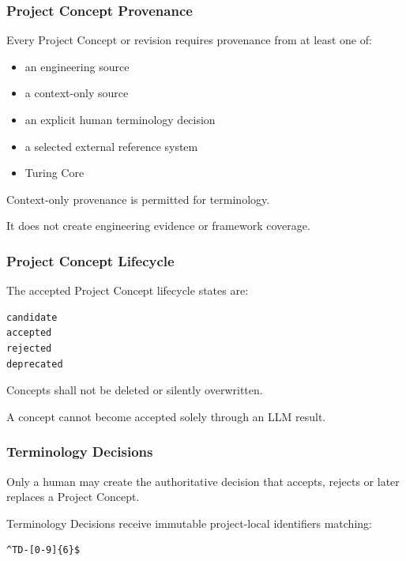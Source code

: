\hypertarget{project-concept-provenance}{%
\subsubsection{Project Concept Provenance}\label{project-concept-provenance}}

Every Project Concept or revision requires provenance from at least one of:

\begin{itemize}
\tightlist
\item
  an engineering source
\item
  a context-only source
\item
  an explicit human terminology decision
\item
  a selected external reference system
\item
  Turing Core
\end{itemize}

Context-only provenance is permitted for terminology.

It does not create engineering evidence or framework coverage.

\hypertarget{project-concept-lifecycle}{%
\subsubsection{Project Concept Lifecycle}\label{project-concept-lifecycle}}

The accepted Project Concept lifecycle states are:

\begin{verbatim}
candidate
accepted
rejected
deprecated
\end{verbatim}

Concepts shall not be deleted or silently overwritten.

A concept cannot become accepted solely through an LLM result.

\hypertarget{terminology-decisions}{%
\subsubsection{Terminology Decisions}\label{terminology-decisions}}

Only a human may create the authoritative decision that accepts, rejects or later replaces a Project Concept.

Terminology Decisions receive immutable project-local identifiers matching:

\begin{verbatim}
^TD-[0-9]{6}$
\end{verbatim}

